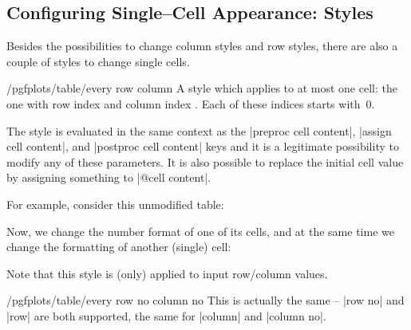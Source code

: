 \subsection{Configuring Single--Cell Appearance: Styles}
Besides the possibilities to change column styles and row styles, there are also a couple of styles to change single cells.
\begin{stylekey}{/pgfplots/table/every row  column }
	A style which applies to at most one cell: the one with row index  and column index . Each of these indices starts with~$0$.

	The style is evaluated in the same context as the |preproc cell content|, |assign cell content|, and |postproc cell content| keys and it is a legitimate possibility to modify any of these parameters. It is also possible to replace the initial cell value by assigning something to |@cell content|.

	For example, consider this unmodified table:
\begin{codeexample}[]
\end{codeexample}

	Now, we change the number format of one of its cells, and at the same time we change the formatting of another (single) cell:
\begin{codeexample}[]
\end{codeexample}
	Note that this style is (only) applied to input row/column values.
\end{stylekey}

\begin{stylekey}{/pgfplots/table/every row no  column no }
	This is actually the same -- |row no| and |row| are both supported, the same for |column| and |column no|.
\end{stylekey}


